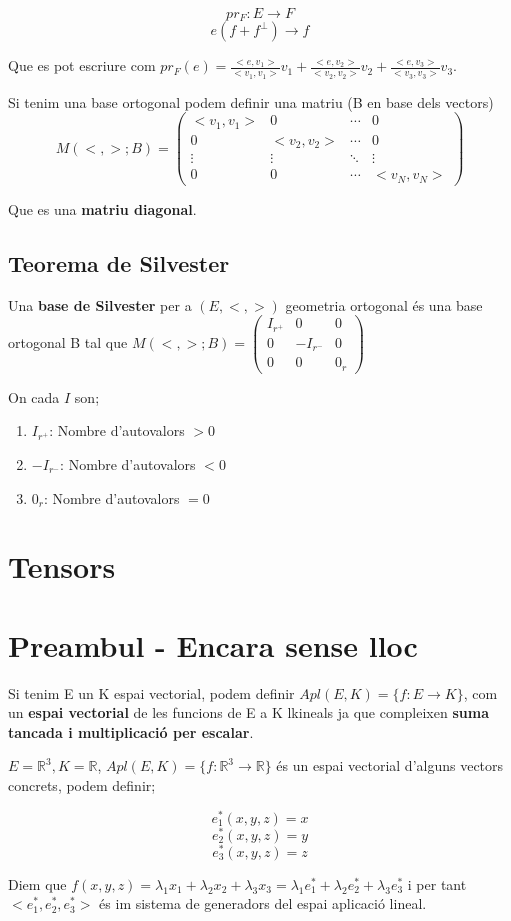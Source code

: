\documentclass[12pt]{article}
\newcommand{\R}{\mathbb{R}}
\begin{document}
\[pr_F:E\rightarrow F\]
\[e (f+f^{\perp}) \rightarrow f\]

Que es pot escriure com $pr_F(e) = \frac{<e,v_1>}{<v_1,v_1>}v_1 + \frac{<e,v_2>}{<v_2,v_2>}v_2 + \frac{<e,v_3>}{<v_3,v_3>}v_3$.

Si tenim una base ortogonal podem definir una matriu (B en base dels vectors)\[M(<,>; B) = \begin{pmatrix}
< v_1,v_1> & 0 & \cdots & 0\\
0 & < v_2,v_2>& \cdots & 0\\
\vdots & \vdots & \ddots & \vdots\\
0 & 0 & \cdots &<v_N,v_N>
\end{pmatrix}\]

Que es una \textbf{matriu diagonal}.

\subsection{Teorema de Silvester}

Una \textbf{base de Silvester} per a $(E, <,>)$ geometria ortogonal és una base ortogonal B tal que $M(<,>; B) = \begin{pmatrix}
    I_{r^+} & 0 & 0\\
    0 & -I_{r^-} &0 \\
    0 & 0 & 0_r
\end{pmatrix}$

On cada $I$ son;

\begin{enumerate}
    \item  $I_{r^+}$: Nombre d'autovalors $>0$
    \item  $-I_{r^-}$: Nombre d'autovalors $<0$
    \item  $0_r$: Nombre d'autovalors $=0$
\end{enumerate}

\section{Tensors}
\section{Preambul - Encara sense lloc}

Si tenim E un K espai vectorial, podem definir $Apl(E,K) = \{f: E \rightarrow K\}$, com un \textbf{espai vectorial} de les funcions de E a K lkineals ja que compleixen \textbf{suma tancada i multiplicació per escalar}. 

\begin{examplebox}{}
    $E = \R^3, K = \R$, $Apl(E,K) = \{f:\R^3 \rightarrow \R\}$ és un espai vectorial d'alguns vectors concrets, podem definir;

    \[e_1^*(x,y,z) = x\]
    \[e_2^*(x,y,z) = y\]
    \[e_3^*(x,y,z) = z\]

    Diem que $f(x,y,z) = \lambda_1x_1 + \lambda_2x_2 + \lambda_3x_3 = \lambda_1 e_1^* + \lambda_2 e_2^* + \lambda_3 e_3^* $ i per tant $<e_1^*, e_2^*, e_3^*>$ és im sistema de generadors del espai aplicació lineal.
\end{examplebox}
\end{document}
